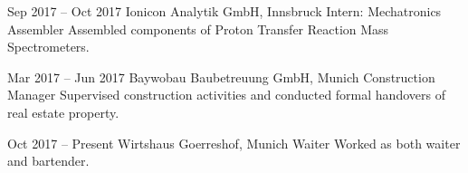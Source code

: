 \jobentry
	{Sep 2017 -- Oct 2017} %
	{} %
	{Ionicon Analytik GmbH, Innsbruck} %
	{Intern: Mechatronics Assembler} %
	{Assembled components of Proton Transfer Reaction Mass Spectrometers.} %

\jobentry
	{Mar 2017 -- Jun 2017} %
	{} %
	{Baywobau Baubetreuung GmbH, Munich} %
	{Construction Manager} %
	{Supervised construction activities and conducted formal handovers of real estate property.} %

\jobentry
	{Oct 2017 -- Present} %
	{} %
	{Wirtshaus Goerreshof, Munich} %
	{Waiter} %
	{Worked as both waiter and bartender.} %
